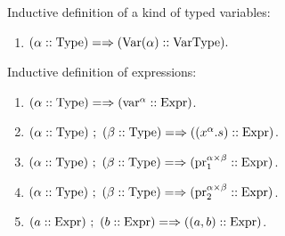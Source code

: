 \begin{definition}[$\VarType$]
Inductive definition of a kind of typed variables:
\begin{enumerate}
\item $(\alpha::\mathrm{Type}) =\Rightarrow (\mathrm{Var}(\alpha)::\mathrm{Var}\mathrm{Type}).$
\end{enumerate}
\end{definition}
\begin{definition}[$\Expr$]
Inductive definition of expressions:
\begin{enumerate}
\item $(\alpha::\mathrm{Type})=\Rightarrow ({\textrm{var}}^\alpha :: \mathrm{Expr})$.
\item $(\alpha::\Type)\ ;\ (\beta::\Type)\CImplies ((x^{\alpha}.s) :: \Expr)$.
\item $(\alpha::\Type)\ ;\ (\beta::\Type)\CImplies (\pr^{\alpha\times\beta}_1 :: \Expr)$.
\item $(\alpha::\Type)\ ;\ (\beta::\Type)\CImplies (\pr^{\alpha\times\beta}_2 :: \Expr)$.
\item $(a::\mathrm{Expr})\ ;\ (b::\mathrm{Expr})=\Rightarrow ((a,b) :: \mathrm{Expr})$.
\end{enumerate}
\end{definition}

